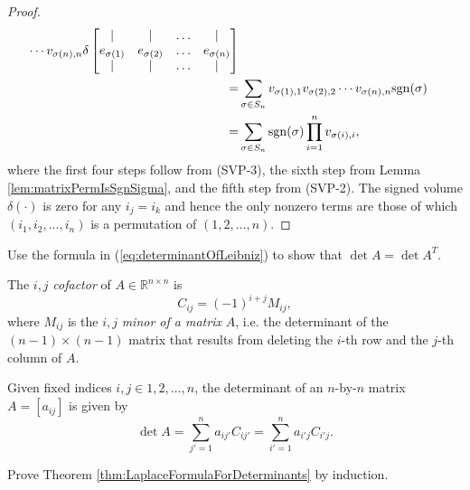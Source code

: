 \begin{proof}
\begin{align*}
       \cdots v_{\sigma(n),n}
    \delta
    \begin{bmatrix}
      | & | & \ldots & |
      \\
      e_{\sigma(1)} & e_{\sigma(2)} & \ldots & e_{\sigma(n)}
      \\
      | & | & \ldots & |
    \end{bmatrix}
    \\
    =& \sum_{\sigma\in S_n} v_{\sigma(1),1}v_{\sigma(2),2}
       \cdots v_{\sigma(n),n}
       \mathrm{sgn}(\sigma)
    \\
    =& \sum_{\sigma\in S_n} \mathrm{sgn}(\sigma)
       \prod_{i=1}^nv_{\sigma(i),i}, 
  \end{align*}
  where the first four steps follow from (SVP-3),
  the sixth step from Lemma \ref{lem:matrixPermIsSgnSigma},
  and the fifth step from \mbox{(SVP-2)}.
  The signed volume $\delta(\cdot)$ is zero for any $i_j=i_k$
   and hence the only nonzero terms are those
   of which $(i_1, i_2, \ldots, i_n)$
   is a permutation of $(1,2,\ldots,n)$.
\end{proof}

\begin{exc}
  Use the formula in (\ref{eq:determinantOfLeibniz})
   to show that $\det A = \det A^T$.
\end{exc}

\begin{defn}
  \label{def:cofactor}
  The $i, j$ \emph{cofactor} of $A\in \mathbb{R}^{n\times n}$
   is 
   \begin{equation}
     \label{eq:cofactor}
     C_{ij} = (-1)^{i+j} M_{ij},
   \end{equation}
   where $M_{ij}$ is the $i, j$ \emph{minor of a matrix} $A$,
   i.e. the determinant of the $(n-1)\times(n-1)$ matrix
   that results from deleting the $i$-th row and the $j$-th column of $A$.
\end{defn}

\begin{thm}
  \label{thm:LaplaceFormulaForDeterminants}
  Given fixed indices $i, j \in {1, 2, \ldots, n}$,
  the determinant of an $n$-by-$n$ matrix $A = [a_{ij}]$
   is given by
   \begin{equation}
     \label{eq:LaplaceFormulaForDeterminants}
     \det A = \sum_{j'=1}^n a_{ij'} C_{ij'} = \sum_{i'=1}^n a_{i'j} C_{i'j}.
   \end{equation}
\end{thm}

\begin{exc}
  Prove Theorem \ref{thm:LaplaceFormulaForDeterminants}
  by induction.
\end{exc}

